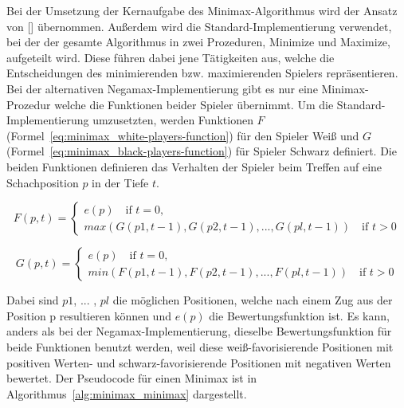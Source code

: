 Bei der Umsetzung der Kernaufgabe des Minimax-Algorithmus wird der Ansatz von [\cite{Knuth1975}] übernommen.
Außerdem wird die Standard-Implementierung verwendet, bei der der gesamte Algorithmus in zwei Prozeduren, Minimize und  Maximize, aufgeteilt wird.
Diese führen dabei jene Tätigkeiten aus, welche die Entscheidungen des minimierenden bzw. maximierenden Spielers repräsentieren.
Bei der alternativen Negamax-Implementierung gibt es nur eine Minimax-Prozedur welche die Funktionen beider Spieler übernimmt.
Um die Standard-Im\-ple\-men\-tie\-rung umzusetzten, werden Funktionen $F$ (Formel~\ref{eq:minimax_white-players-function}) für den Spieler Weiß und $G$ (Formel~\ref{eq:minimax_black-players-function}) für Spieler Schwarz definiert. Die beiden Funktionen definieren das Verhalten der Spieler beim Treffen auf eine Schachposition $p$ in der Tiefe $t$.

\begin{equation} \label{eq:minimax_white-players-function}
    F(p,t) =
    \begin{cases}
        e(p) \quad \text{if }t=0,\\
        max(G(p1, t-1), G(p2, t-1), ... , G(pl, t-1)) \quad \text{if } t > 0
    \end{cases}
\end{equation}

\begin{equation} \label{eq:minimax_black-players-function}
    G(p,t) =
    \begin{cases}
        e(p) \quad \text{if }t=0,\\
        min(F(p1, t-1), F(p2, t-1), ... , F(pl, t-1)) \quad \text{if } t > 0
    \end{cases}
\end{equation}

Dabei sind $p1$, ... , $pl$ die möglichen Positionen, welche nach einem Zug aus der Position p resultieren können und $e(p)$ die Bewertungsfunktion ist.
Es kann, anders als bei der Negamax-Implementierung, dieselbe Bewertungsfunktion für beide Funktionen benutzt werden, weil diese weiß-favorisierende Positionen mit positiven Werten- und schwarz-favorisierende Positionen mit negativen Werten bewertet.
Der Pseudocode für einen Minimax ist in Algorithmus~\ref{alg:minimax_minimax} dargestellt.

